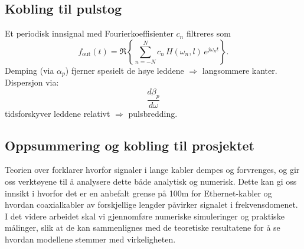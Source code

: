 \subsection{Kobling til pulstog}
Et periodisk innsignal med Fourierkoeffisienter \(c_n\) filtreres som
\[
f_{\text{out}}(t)=\Re\!\left\{\sum_{n=-N}^{N} c_n\,H(\omega_n,l)\,e^{j\omega_n t}\right\}.
\]
Demping (via \(\alpha_p\)) fjerner spesielt de høye leddene \(\Rightarrow\) langsommere kanter.\\
Dispersjon via: 
\[\frac{d\beta_p}{d\omega}\] 
tidsforskyver leddene relativt \(\Rightarrow\) pulsbredding.


\subsection{Oppsummering og kobling til prosjektet}

Teorien over forklarer hvorfor signaler i lange kabler dempes og forvrenges, og gir oss verktøyene til å analysere dette både analytisk og numerisk. Dette kan gi oss innsikt i hvorfor det er en anbefalt grense på 100m for Ethernet-kabler og hvordan coaxialkabler av forskjellige lengder påvirker signalet i frekvensdomenet. I det videre arbeidet skal vi gjennomføre numeriske simuleringer og praktiske målinger, slik at de kan sammenlignes med de teoretiske resultatene for å se hvordan modellene stemmer med virkeligheten.
